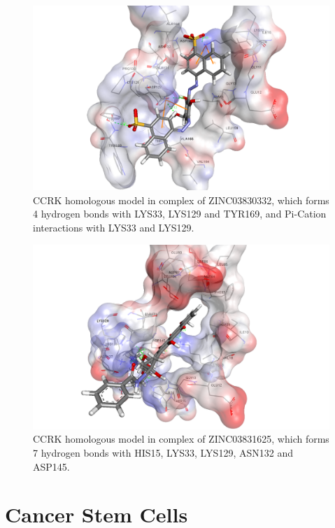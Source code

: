 \begin{figure}
\centering
\includegraphics[width=\linewidth]{Case/1HCL-ZINC03830332.png}
\caption{CCRK homologous model in complex of ZINC03830332, which forms 4 hydrogen bonds with LYS33, LYS129 and TYR169, and Pi-Cation interactions with LYS33 and LYS129.}
\label{Case:1HCL-ZINC03830332}
\end{figure}

\begin{figure}
\centering
\includegraphics[width=\linewidth]{Case/1HCL-ZINC03831625.png}
\caption{CCRK homologous model in complex of ZINC03831625, which forms 7 hydrogen bonds with HIS15, LYS33, LYS129, ASN132 and ASP145.}
\label{Case:1HCL-ZINC03831625}
\end{figure}

\section{Cancer Stem Cells}

